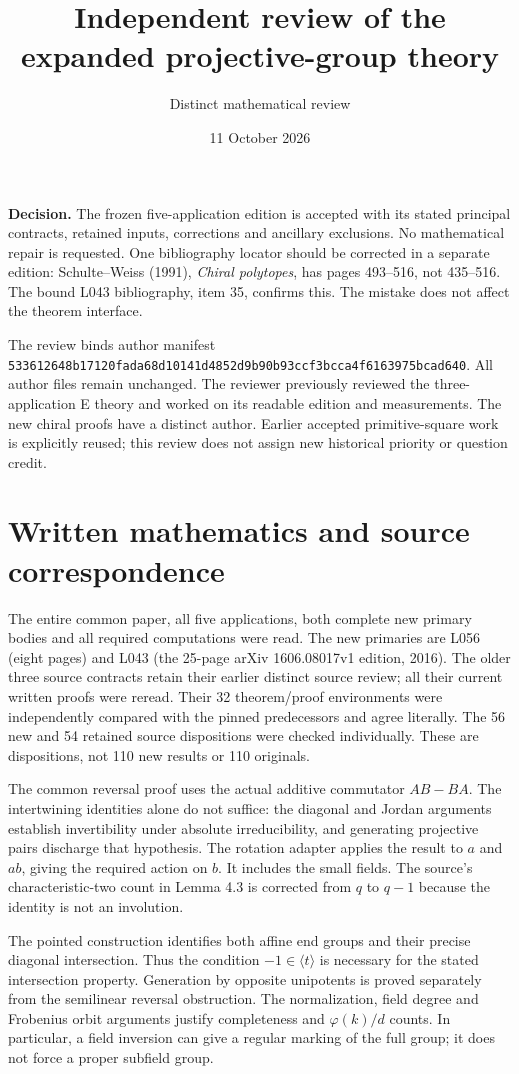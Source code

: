 \documentclass[11pt,a4paper]{article}
\title{Independent review of the expanded projective-group theory}
\author{Distinct mathematical review}\date{11 October 2026}
\begin{document}
\maketitle
\textbf{Decision.} The frozen five-application edition is accepted with its stated
principal contracts, retained inputs, corrections and ancillary exclusions.
No mathematical repair is requested. One bibliography locator should be
corrected in a separate edition: Schulte--Weiss (1991), \emph{Chiral polytopes},
has pages 493--516, not 435--516. The bound L043 bibliography, item 35, confirms
this. The mistake does not affect the theorem interface.

The review binds author manifest
\texttt{533612648b17120fada68d10141d4852d9b90b93ccf3bcca4f6163975bcad640}.
All author files remain unchanged. The reviewer previously reviewed the
three-application E theory and worked on its readable edition and measurements.
The new chiral proofs have a distinct author. Earlier accepted primitive-square
work is explicitly reused; this review does not assign new historical priority
or question credit.

\section*{Written mathematics and source correspondence}
The entire common paper, all five applications, both complete new primary
bodies and all required computations were read. The new primaries are L056
(eight pages) and L043 (the 25-page arXiv 1606.08017v1 edition, 2016).
The older three source contracts retain their earlier distinct source review;
all their current written proofs were reread. Their 32 theorem/proof environments
were independently compared with the pinned predecessors and agree literally.
The 56 new and 54 retained source dispositions were checked individually.
These are dispositions, not 110 new results or 110 originals.

The common reversal proof uses the actual additive commutator $AB-BA$.
The intertwining identities alone do not suffice: the diagonal and Jordan
arguments establish invertibility under absolute irreducibility, and generating
projective pairs discharge that hypothesis. The rotation adapter applies the
result to $a$ and $ab$, giving the required action on $b$. It includes the small
fields. The source's characteristic-two count in Lemma 4.3 is corrected from
$q$ to $q-1$ because the identity is not an involution.

The pointed construction identifies both affine end groups and their precise
diagonal intersection. Thus the condition $-1\in\langle t\rangle$ is necessary
for the stated intersection property. Generation by opposite unipotents is
proved separately from the semilinear reversal obstruction. The normalization,
field degree and Frobenius orbit arguments justify completeness and
$\varphi(k)/d$ counts. In particular, a field inversion can give a regular
marking of the full group; it does not force a proper subfield group.
\end{document}

